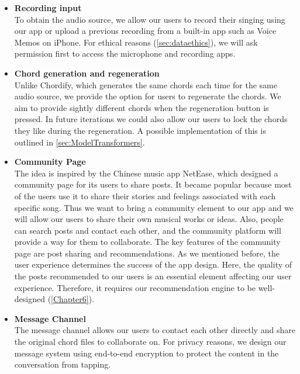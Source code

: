 \begin{itemize}
\item \textbf{Recording input}
\\ To obtain the audio source, we allow our users to record their singing using our app or upload a previous recording 
from a built-in app such as Voice Memos on iPhone. For ethical reasons (\cref{sec:dataethics}), we will ask permission first to access the microphone and recording apps.

\item \textbf{Chord generation and regeneration}
\\Unlike Chordify, which generates the same chords each time for the same audio source, we provide the option for users to regenerate the chords. We aim to provide sightly different chords when the regeneration button is pressed. 
In future iterations we could also allow our users to lock the chords they like during the regeneration. A possible implementation of this is outlined in \cref{sec:ModelTransformers}.

\item \textbf{Community Page}
\\The idea is inspired by the Chinese music app NetEase, which designed a community page for its users to share posts. 
It became popular because most of the users use it to share their stories and feelings associated with each specific song. 
Thus we want to bring a community element to our app and we will allow our users to share their own musical works or ideas. 
Also, people can search posts and contact each other, and the community platform will provide a way for them to collaborate. 
The key features of the community page are post sharing and recommendations.
As we mentioned before, the user experience determines the success of the app design. 
Here, the quality of the posts recommended to our users is an essential element affecting our user experience. 
Therefore, it requires our recommendation engine to be well-designed (\cref{Chapter6}).

\item \textbf{Message Channel}
\\The message channel allows our users to contact each other directly and share the original chord files to collaborate on. For privacy reasons, we design our message system using end-to-end encryption to protect the content in the conversation from tapping.

\end{itemize}

